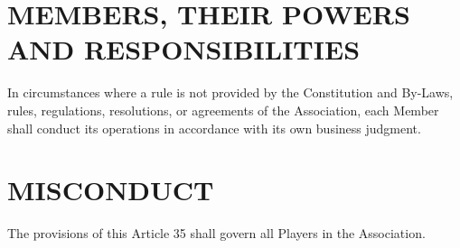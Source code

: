\documentclass[]{book}
\begin{document}
\hypertarget{members-their-powers-and-responsibilities}{%
\section{MEMBERS, THEIR POWERS AND RESPONSIBILITIES}\label{members-their-powers-and-responsibilities}}

In circumstances where a rule is not provided by the Constitution and By-Laws, rules, regulations, resolutions, or agreements of the Association, each Member shall conduct its operations in accordance with its own business judgment.

\hypertarget{misconduct}{%
\section{MISCONDUCT}\label{misconduct}}

The provisions of this Article 35 shall govern all Players in the Association.
\end{document}
